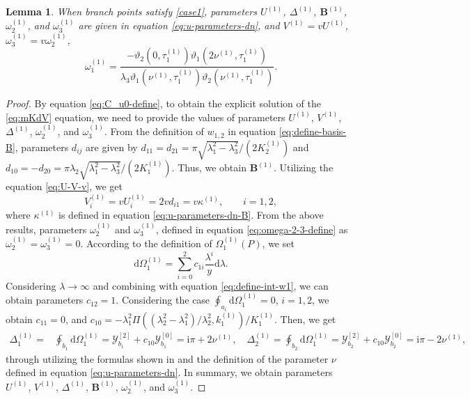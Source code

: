 \documentclass[11pt,reqno]{amsart}
\newcommand{\ii}{\mathrm{i}}
\newcommand{\dd}{\mathrm{d}}
\newtheorem{lemma}{Lemma}
\numberwithin{equation}{section}
\begin{document}
\begin{lemma}\label{lemma:U-V-R-dn}
	When branch points satisfy \ref{case1}, parameters $U^{(1)}$, $\Delta^{(1)}$, $\mathbf{B}^{(1)}$, $\omega_2^{(1)}$, and $\omega_3^{(1)}$ are given in equation \eqref{eq:u-parameters-dn}, and $V^{(1)}=vU^{(1)}$, $\omega_3^{(1)}=v\omega_2^{(1)}$,
	\begin{equation}\nonumber
		\omega_1^{(1)}=
		\frac{-\vartheta_2(0,  \tau^{(1)}_1)\vartheta_1(2 \nu^{(1)} ,  \tau^{(1)}_1)}{\lambda_3\vartheta_1( \nu^{(1)} ,  \tau^{(1)}_1)\vartheta_2( \nu^{(1)} ,  \tau^{(1)}_1)}.
	\end{equation}
\end{lemma}

\begin{proof}
	By equation \eqref{eq:C_u0-define}, to obtain the explicit solution of the \ref{eq:mKdV} equation, we need to provide the values of parameters $U^{(1)}$, $V^{(1)}$, $\Delta^{(1)}$, $\omega_2^{(1)}$, and $\omega_3^{(1)}$.
	From the definition of $w_{1,2}$ in equation \eqref{eq:define-basis-B}, parameters $d_{ij}$ are given by $d_{11}=d_{21}= \pi\sqrt{\lambda_1^2-\lambda_3^2}/(2   K^{(1)}_2)$ and $d_{10}=-d_{20}=\pi \lambda_2\sqrt{\lambda_1^2-\lambda_3^2}/(2  K^{(1)}_1)$.
	Thus, we obtain $ \mathbf{B}^{(1)}$.
	Utilizing the equation \eqref{eq:U-V-v}, we get
		\begin{equation}\nonumber
			V_i^{(1)}=vU_i^{(1)}=2vd_{i1}=v \kappa^{(1)}, \qquad i=1,2,
		\end{equation}
		where $\kappa^{(1)}$ is defined in equation \eqref{eq:u-parameters-dn-B}.
	From the above results, parameters $\omega_2^{(1)}$ and $\omega_3^{(1)}$, defined in equation \eqref{eq:omega-2-3-define} as $\omega_2^{(1)}=\omega_3^{(1)}=0$.
	According to the definition of $\Omega_{1}^{(1)}(P)$, we set 
		\begin{equation}\label{eq:define-Omega-1-c}
			\dd\Omega_1^{(1)}=\sum_{i=0}^2 c_{1i}\frac{\lambda^i}{y}\dd \lambda.
		\end{equation}
		Considering $\lambda \rightarrow \infty$ and combining with equation \eqref{eq:define-int-w1}, we can obtain parameters $c_{12}=1$.
		Considering the case $\oint_{a_i}\dd \Omega_1^{(1)}=0$, $i=1,2$, we obtain $c_{11}=0$, and $c_{10}=-\lambda_1^2\Pi((\lambda_2^2-\lambda_1^2)/\lambda_2^2,  k^{(1)}_1)/  K^{(1)}_1$.
		Then, we get
		\begin{equation}\nonumber
			\begin{split}
				\Delta_1^{(1)}=&\oint_{b_1}\dd\Omega_1^{(1)}=\mathcal{Y}_{b_1}^{[2]}+c_{10}\mathcal{Y}_{b_1}^{[0]}
				=\ii \pi +2\nu^{(1)}, \quad 
				\Delta_2^{(1)}=\oint_{b_2}\dd\Omega_1^{(1)}
				=\mathcal{Y}_{b_2}^{[2]}+c_{10}\mathcal{Y}_{b_2}^{[0]}
				=\ii \pi -2\nu^{(1)} ,
			\end{split}
		\end{equation}
		through utilizing the formulas shown in \cite{ByrdF-54} and the definition of the parameter $\nu$ defined in equation \eqref{eq:u-parameters-dn}. 	
	In summary, we obtain parameters $U^{(1)}$, $V^{(1)}$, $\Delta^{(1)}$, $ \mathbf{B}^{(1)} $, $\omega_2^{(1)}$, and $\omega_3^{(1)}$.
	

\end{proof}
\end{document}
